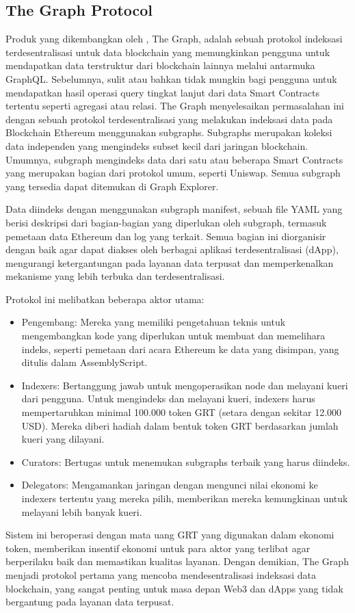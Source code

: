 \subsection{The Graph Protocol}
\label{subsec:the-graph-protocol}

Produk yang dikembangkan oleh \cite{TheGraphDocs}, The Graph, adalah sebuah protokol indeksasi terdesentralisasi untuk data blockchain yang memungkinkan pengguna untuk mendapatkan data terstruktur dari blockchain lainnya melalui antarmuka GraphQL. Sebelumnya, sulit atau bahkan tidak mungkin bagi pengguna untuk mendapatkan hasil operasi query tingkat lanjut dari data Smart Contracts tertentu seperti agregasi atau relasi. The Graph menyelesaikan permasalahan ini dengan sebuah protokol terdesentralisasi yang melakukan indeksasi data pada Blockchain Ethereum menggunakan subgraphs. Subgraphs merupakan koleksi data independen yang mengindeks subset kecil dari jaringan blockchain. Umumnya, subgraph mengindeks data dari satu atau beberapa Smart Contracts yang merupakan bagian dari protokol umum, seperti Uniswap. Semua subgraph yang tersedia dapat ditemukan di Graph Explorer.

Data diindeks dengan menggunakan subgraph manifest, sebuah file YAML yang berisi deskripsi dari bagian-bagian yang diperlukan oleh subgraph, termasuk pemetaan data Ethereum dan log yang terkait. Semua bagian ini diorganisir dengan baik agar dapat diakses oleh berbagai aplikasi terdesentralisasi (dApp), mengurangi ketergantungan pada layanan data terpusat dan memperkenalkan mekanisme yang lebih terbuka dan terdesentralisasi.

Protokol ini melibatkan beberapa aktor utama:

\begin{itemize}
	\item Pengembang: Mereka yang memiliki pengetahuan teknis untuk mengembangkan kode yang diperlukan untuk membuat dan memelihara indeks, seperti pemetaan dari acara Ethereum ke data yang disimpan, yang ditulis dalam AssemblyScript.
	\item Indexers: Bertanggung jawab untuk mengoperasikan node dan melayani kueri dari pengguna. Untuk mengindeks dan melayani kueri, indexers harus mempertaruhkan minimal 100.000 token GRT (setara dengan sekitar 12.000 USD). Mereka diberi hadiah dalam bentuk token GRT berdasarkan jumlah kueri yang dilayani.
	\item Curators: Bertugas untuk menemukan subgraphs terbaik yang harus diindeks.
	\item Delegators: Mengamankan jaringan dengan mengunci nilai ekonomi ke indexers tertentu yang mereka pilih, memberikan mereka kemungkinan untuk melayani lebih banyak kueri.
\end{itemize}

Sistem ini beroperasi dengan mata uang GRT yang digunakan dalam ekonomi token, memberikan insentif ekonomi untuk para aktor yang terlibat agar berperilaku baik dan memastikan kualitas layanan. Dengan demikian, The Graph menjadi protokol pertama yang mencoba mendesentralisasi indeksasi data blockchain, yang sangat penting untuk masa depan Web3 dan dApps yang tidak bergantung pada layanan data terpusat.